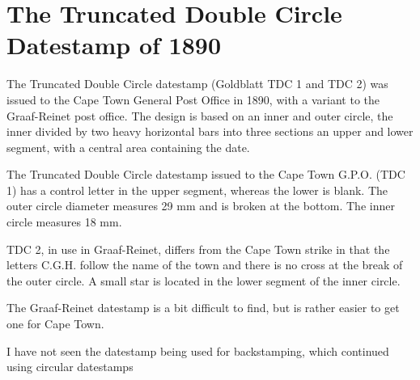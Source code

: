 \section{The Truncated Double Circle Datestamp of 1890}


The Truncated Double Circle datestamp (Goldblatt  TDC 1 and TDC 2) was 
issued to the Cape Town General Post Office in 1890, with a variant 
to the Graaf-Reinet post office. The design is based on an inner and 
outer circle, the inner divided by two heavy horizontal bars into 
three sections an upper and lower segment, with a central area 
containing the date.

The Truncated Double Circle datestamp issued to the Cape Town G.P.O. 
(TDC 1) has a control letter in the upper segment, whereas the lower
is blank. The outer circle diameter measures 29 mm and is broken at
the bottom. The inner circle measures 18 mm.


TDC 2, in use in Graaf-Reinet, differs from the Cape Town strike in 
that the letters C.G.H. follow 
the name of the town and there is no cross at the break of the outer circle. 
A small star is located in the lower segment of the inner circle.

The Graaf-Reinet datestamp is a bit difficult to find, but is rather
easier to get one for Cape Town.



I have not seen the datestamp being used for backstamping, which  continued using  circular datestamps 



 





 

                   